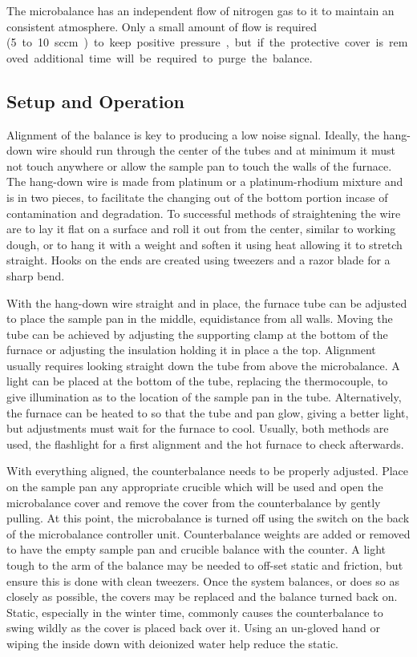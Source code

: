     The microbalance has an independent flow of nitrogen gas to it to maintain an consistent atmosphere.
    Only a small amount of flow is required (\SI{5} to \SI{10}{sccm}) to keep positive pressure, but if the protective cover is removed additional time will be required to purge the balance.

    \subsection{Setup and Operation}
        Alignment of the balance is key to producing a low noise signal.
        Ideally, the hang-down wire should run through the center of the tubes and at minimum it must not touch anywhere or allow the sample pan to touch the walls of the furnace.
        The hang-down wire is made from platinum or a platinum-rhodium mixture and is in two pieces, to facilitate the changing out of the bottom portion incase of contamination and degradation.
        To successful methods of straightening the wire are to lay it flat on a surface and roll it out from the center, similar to working dough, or to hang it with a weight and soften it using heat allowing it to stretch straight.
        Hooks on the ends are created using tweezers and a razor blade for a sharp bend.

        With the hang-down wire straight and in place, the furnace tube can be adjusted to place the sample pan in the middle, equidistance from all walls.
        Moving the tube can be achieved by adjusting the supporting clamp at the bottom of the furnace or adjusting the insulation holding it in place a the top.
        Alignment usually requires looking straight down the tube from above the microbalance.
        A light can be placed at the bottom of the tube, replacing the thermocouple, to give illumination as to the location of the sample pan in the tube.
        Alternatively, the furnace can be heated to  so that the tube and pan glow, giving a better light, but adjustments must wait for the furnace to cool.
        Usually, both methods are used, the flashlight for a first alignment and the hot furnace to check afterwards.

        With everything aligned, the counterbalance needs to be properly adjusted.
        Place on the sample pan any appropriate crucible which will be used and open the microbalance cover and remove the cover from the counterbalance by gently pulling.
        At this point, the microbalance is turned off using the switch on the back of the microbalance controller unit.
        Counterbalance weights are added or removed to have the empty sample pan and crucible balance with the counter.
        A light tough to the arm of the balance may be needed to off-set static and friction, but ensure this is done with clean tweezers.
        Once the system balances, or does so as closely as possible, the covers may be replaced and the balance turned back on.
        Static, especially in the winter time, commonly causes the counterbalance to swing wildly as the cover is placed back over it.
        Using an un-gloved hand or wiping the inside down with deionized water help reduce the static.

